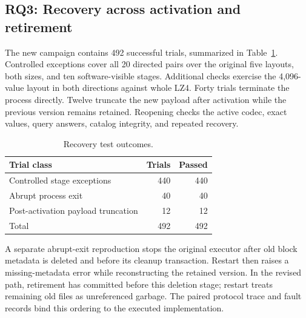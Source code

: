 \subsection{RQ3: Recovery across activation and retirement}
The new campaign contains 492 successful trials, summarized in Table~\ref{tab:recovery}. Controlled exceptions cover all 20 directed pairs over the original five layouts, both sizes, and ten software-visible stages. Additional checks exercise the 4,096-value layout in both directions against whole LZ4. Forty trials terminate the process directly. Twelve truncate the new payload after activation while the previous version remains retained. Reopening checks the active codec, exact values, query answers, catalog integrity, and repeated recovery.
\begin{table}[t]
\centering\small
\caption{Recovery test outcomes.}
\label{tab:recovery}
\begin{tabular}{@{}lrr@{}}\toprule
Trial class & Trials & Passed \\
\midrule
Controlled stage exceptions & 440 & 440 \\
Abrupt process exit & 40 & 40 \\
Post-activation payload truncation & 12 & 12 \\
\midrule Total & 492 & 492 \\
\bottomrule\end{tabular}
\end{table}

A separate abrupt-exit reproduction stops the original executor after old block metadata is deleted and before its cleanup transaction. Restart then raises a missing-metadata error while reconstructing the retained version. In the revised path, retirement has committed before this deletion stage; restart treats remaining old files as unreferenced garbage. The paired protocol trace and fault records bind this ordering to the executed implementation.
